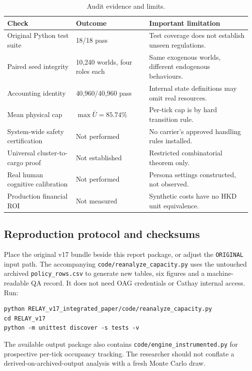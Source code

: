 \documentclass[10pt,a4paper]{article}
\theoremstyle{definition}\newtheorem{definition}[theorem]{Definition}
\theoremstyle{remark}\newtheorem{remark}[theorem]{Remark}
\newcommand{\1}{\mathbbm 1}
\begin{document}
\begin{table}[htbp]\centering\small\caption{Audit evidence and limits.}\begin{tabularx}{\linewidth}{@{}p{.36\linewidth}p{.20\linewidth}X@{}}\toprule
Check & Outcome & Important limitation\\\midrule
Original Python test suite & 18/18 pass & Test coverage does not establish unseen regulations.\\
Paired seed integrity & 10,240 worlds, four roles each & Same exogenous worlds, different endogenous behaviours.\\
Accounting identity & 40,960/40,960 pass & Internal state definitions may omit real resources.\\
Mean physical cap & $\max\bar U=85.74\%$ & Per-tick cap is by hard transition rule.\\
System-wide safety certification & Not performed & No carrier's approved handling rules installed.\\
Universal cluster-to-cargo proof & Not established & Restricted combinatorial theorem only.\\
Real human cognitive calibration & Not performed & Persona settings constructed, not observed.\\
Production financial ROI & Not measured & Synthetic costs have no HKD unit equivalence.\\\bottomrule
\end{tabularx}\end{table}

\subsection{Reproduction protocol and checksums}
Place the original v17 bundle beside this report package, or adjust the \texttt{ORIGINAL} input path. The accompanying \texttt{code/reanalyze\_capacity.py} uses the untouched archived \texttt{policy\_rows.csv} to generate new tables, six figures and a machine-readable QA record. It does not need OAG credentials or Cathay internal access. Run:
\begin{lstlisting}
python RELAY_v17_integrated_paper/code/reanalyze_capacity.py
cd RELAY_v17
python -m unittest discover -s tests -v
\end{lstlisting}
The available output package also contains \texttt{code/engine\_instrumented.py} for prospective per-tick occupancy tracking. The researcher should not conflate a derived-on-archived-output analysis with a fresh Monte Carlo draw.
\end{document}
